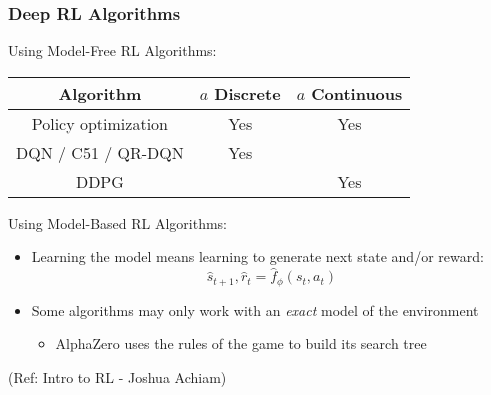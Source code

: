 \begin{frame}[fragile]\frametitle{Deep RL Algorithms}

Using Model-Free RL Algorithms:
\begin{center}
\begin{tabular}{c|c|c}
Algorithm &  $a$ Discrete &$a$  Continuous \\ \hline
Policy optimization & Yes & Yes \\
DQN / C51 / QR-DQN & Yes & \color{red}{No} \\
DDPG & \color{red}{No} & Yes
\end{tabular}
\end{center}

Using Model-Based RL Algorithms:
\begin{itemize}
\item Learning the model means learning to generate next state and/or reward:
%
\begin{equation*}
\hat{s}_{t+1}, \hat{r}_t = \hat{f}_{\phi}(s_t, a_t)
\end{equation*}
\item Some algorithms may only work with an \textit{exact} model of the environment
\begin{itemize}
\item AlphaZero uses the rules of the game to build its search tree
\end{itemize}
\end{itemize}

{\tiny (Ref: Intro to RL - Joshua Achiam)}


\end{frame}

